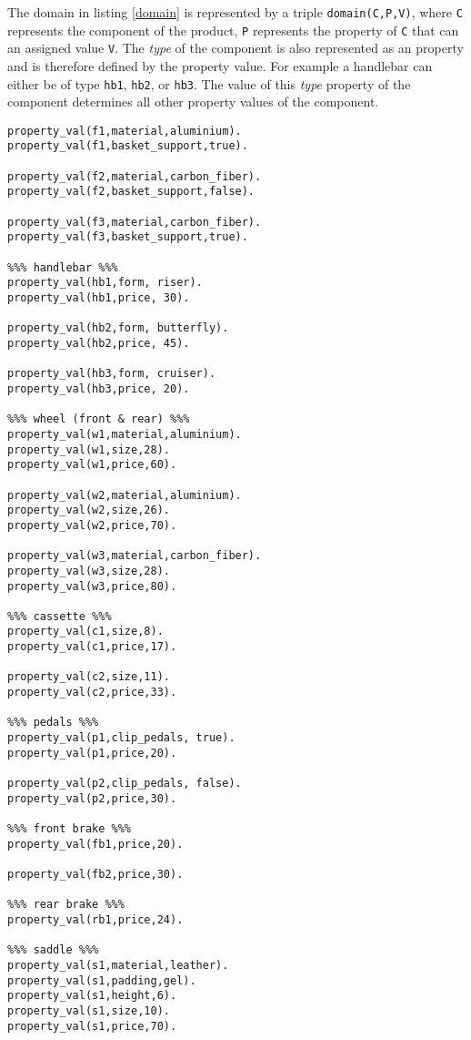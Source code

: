 The domain in listing \ref{domain} is represented by a triple \texttt{domain(C,P,V)}, where \texttt{C} represents the component of the product, \texttt{P} represents the property of \texttt{C} that can an assigned value \texttt{V}. The \textit{type} of the component is also represented as an property and is therefore defined by the property value. For example a handlebar can either be of type \texttt{hb1}, \texttt{hb2}, or \texttt{hb3}. The value of this \textit{type} property of the component determines all other property values of the component. 

\begin{lstlisting}[caption = {Attribute Definition}, basicstyle=\ttfamily, label = {attributes}]
%%% frame %%%
property_val(f1,material,aluminium).
property_val(f1,basket_support,true).

property_val(f2,material,carbon_fiber).
property_val(f2,basket_support,false).

property_val(f3,material,carbon_fiber).
property_val(f3,basket_support,true).

%%% handlebar %%%
property_val(hb1,form, riser).
property_val(hb1,price, 30).

property_val(hb2,form, butterfly).
property_val(hb2,price, 45).

property_val(hb3,form, cruiser).
property_val(hb3,price, 20).

%%% wheel (front & rear) %%%
property_val(w1,material,aluminium).
property_val(w1,size,28).
property_val(w1,price,60).

property_val(w2,material,aluminium).
property_val(w2,size,26).
property_val(w2,price,70).

property_val(w3,material,carbon_fiber).
property_val(w3,size,28).
property_val(w3,price,80).

%%% cassette %%%
property_val(c1,size,8).
property_val(c1,price,17).

property_val(c2,size,11).
property_val(c2,price,33).

%%% pedals %%%
property_val(p1,clip_pedals, true).
property_val(p1,price,20).

property_val(p2,clip_pedals, false).
property_val(p2,price,30).

%%% front brake %%%
property_val(fb1,price,20).

property_val(fb2,price,30).

%%% rear brake %%%
property_val(rb1,price,24).

%%% saddle %%%
property_val(s1,material,leather).
property_val(s1,padding,gel).
property_val(s1,height,6).
property_val(s1,size,10).
property_val(s1,price,70).


\end{lstlisting}
